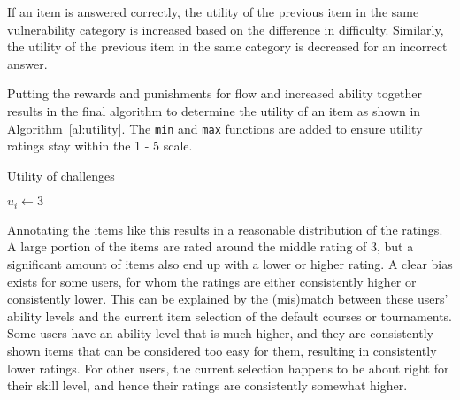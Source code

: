 If an item is answered correctly, the utility of the previous item in the same vulnerability category is increased based on the difference in difficulty.
Similarly, the utility of the previous item in the same category is decreased for an incorrect answer.

Putting the rewards and punishments for flow and increased ability together results in the final algorithm to determine the utility of an item as shown in Algorithm~\ref{al:utility}.
The \texttt{min} and \texttt{max} functions are added to ensure utility ratings stay within the 1 - 5 scale.

\begin{algorithm}[H]
\caption{\label{al:utility}Utility of challenges}
\SetAlgoLined
{}
$u_i \leftarrow 3$\\
    {
    }
\Else
    {
    }
\end{algorithm}

Annotating the items like this results in a reasonable distribution of the ratings.
A large portion of the items are rated around the middle rating of 3, but a significant amount of items also end up with a lower or higher rating.
A clear bias exists for some users, for whom the ratings are either consistently higher or consistently lower.
This can be explained by the (mis)match between these users' ability levels and the current item selection of the default courses or tournaments.
Some users have an ability level that is much higher, and they are consistently shown items that can be considered too easy for them, resulting in consistently lower ratings.
For other users, the current selection happens to be about right for their skill level, and hence their ratings are consistently somewhat higher.